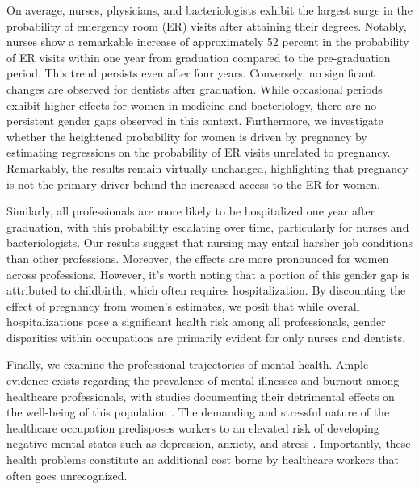 \documentclass[12pt, a4paper]{article}
\begin{document}
On average, nurses, physicians, and bacteriologists exhibit the largest surge in the probability of emergency room (ER) visits after attaining their degrees. Notably, nurses show a remarkable increase of approximately 52 percent in the probability of ER visits within one year from graduation compared to the pre-graduation period. This trend persists even after four years. Conversely, no significant changes are observed for dentists after graduation. While occasional periods exhibit higher effects for women in medicine and bacteriology, there are no persistent gender gaps observed in this context. Furthermore, we investigate whether the heightened probability for women is driven by pregnancy by estimating regressions on the probability of ER visits unrelated to pregnancy. Remarkably, the results remain virtually unchanged, highlighting that pregnancy is not the primary driver behind the increased access to the ER for women. 

Similarly, all professionals are more likely to be hospitalized one year after graduation, with this probability escalating over time, particularly for nurses and bacteriologists. Our results suggest that nursing may entail harsher job conditions than other professions. Moreover, the effects are more pronounced for women across professions. However, it's worth noting that a portion of this gender gap is attributed to childbirth, which often requires hospitalization. By discounting the effect of pregnancy from women's estimates, we posit that while overall hospitalizations pose a significant health risk among all professionals, gender disparities within occupations are primarily evident for only nurses and dentists.

Finally, we examine the professional trajectories of mental health. Ample evidence exists regarding the prevalence of mental illnesses and burnout among healthcare professionals, with studies documenting their detrimental effects on the well-being of this population \citep{lai2020factors,young2021health, gold2013details,johnson2018mental,west2020resilience}. The demanding and stressful nature of the healthcare occupation predisposes workers to an elevated risk of developing negative mental states such as depression, anxiety, and stress \citep{ghazwin2016association,huang2018risks,maharaj2019prevalence}. Importantly, these health problems constitute an additional cost borne by healthcare workers that often goes unrecognized. 
\end{document}
